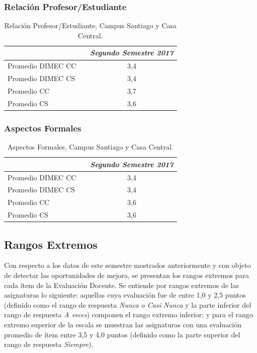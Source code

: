 \documentclass[12pt]{article}
\begin{document}
\subsubsection{Relación Profesor/Estudiante}
\begin{table}[H]
\centering
\begin{tabular}{llc}
& & \textit{Segundo Semestre 2017} \\ \hline
Promedio DIMEC CC & & 3,4 \\
Promedio DIMEC CS & & 3,4 \\
Promedio CC & & 3,7 \\
Promedio CS & & 3,6 \\ \hline
\end{tabular}
\caption{Relación Profesor/Estudiante, Campus Santiago y Casa Central.}
\end{table}
\subsubsection{Aspectos Formales}
\begin{table}[H]
\centering
\begin{tabular}{llc}
& & \textit{Segundo Semestre 2017} \\ \hline
Promedio DIMEC CC & & 3,4\\
Promedio DIMEC CS & & 3,4 \\
Promedio CC & & 3,6 \\
Promedio CS & & 3,6 \\ \hline
\end{tabular}
\caption{Aspectos Formales, Campus Santiago y Casa Central.}
\end{table}

\subsection{Rangos Extremos}
\begin{text}
Con respecto a los datos de este semestre mostrados anteriormente y con objeto de detectar las oportunidades de mejora, se presentan los rangos extremos para cada ítem de la Evaluación Docente. Se entiende por rangos extremos de las asignaturas lo siguiente: aquellas cuya evaluación fue de entre 1,0 y 2,5 puntos (definido como el rango de respuesta \textit{Nunca o Casi Nunca} y la parte inferior del rango de respuesta \textit{A veces}) componen el rango extremo inferior; y para el rango extremo superior de la escala se muestran las asignaturas con una evaluación promedio de ítem entre 3,5 y 4,0 puntos (definido como la parte superior del rango de respuesta \textit{Siempre}). 
\end{text}
\pagebreak
\end{document}
